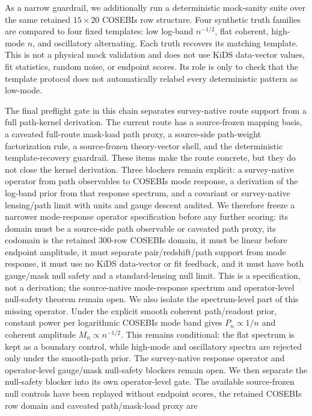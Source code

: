 \documentclass[11pt]{article}
\begin{document}
As a narrow guardrail, we additionally run a deterministic mock-sanity suite
over the same retained \(15\times20\) COSEBIs row structure. Four synthetic
truth families are compared to four fixed templates: low log-band
\(n^{-1/2}\), flat coherent, high-mode \(n\), and oscillatory alternating. Each
truth recovers its matching template. This is not a physical mock validation and
does not use KiDS data-vector values, fit statistics, random noise, or endpoint
scores. Its role is only to check that the template protocol does not
automatically relabel every deterministic pattern as low-mode.

The final preflight gate in this chain separates survey-native route support
from a full path-kernel derivation. The current route has a source-frozen
mapping basis, a caveated full-route mask-load path proxy, a source-side
path-weight factorization rule, a source-frozen theory-vector shell, and the
deterministic template-recovery guardrail. These items make the route concrete,
but they do not close the kernel derivation. Three blockers remain explicit: a
survey-native operator from path observables to COSEBIs mode response, a
derivation of the log-band prior from that response spectrum, and a covariant
or survey-native lensing/path limit with units and gauge descent audited.
We therefore freeze a narrower mode-response operator specification before any
further scoring: its domain must be a source-side path observable or caveated
path proxy, its codomain is the retained 300-row COSEBIs domain, it must be
linear before endpoint amplitude, it must separate pair/redshift/path support
from mode response, it must use no KiDS data-vector or fit feedback, and it must
have both gauge/mask null safety and a standard-lensing null limit. This is a
specification, not a derivation; the source-native mode-response spectrum and
operator-level null-safety theorem remain open.
We also isolate the spectrum-level part of this missing operator. Under the
explicit smooth coherent path/readout prior, constant power per logarithmic
COSEBIs mode band gives \(P_n\propto 1/n\) and coherent amplitude
\(M_n\propto n^{-1/2}\). This remains conditional: the flat spectrum is kept as
a boundary control, while high-mode and oscillatory spectra are rejected only
under the smooth-path prior. The survey-native response operator and
operator-level gauge/mask null-safety blockers remain open.
We then separate the null-safety blocker into its own operator-level gate. The
available source-frozen null controls have been replayed without endpoint
scores, the retained COSEBIs row domain and caveated path/mask-load proxy are
\end{document}
